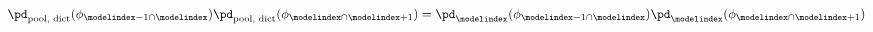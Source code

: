 \begin{equation}
  \pd_{\text{pool, dict}}(\phi_{\modelindex - 1 \cap \modelindex})
  \pd_{\text{pool, dict}}(\phi_{\modelindex \cap \modelindex + 1}) =
    \pd_{\modelindex}(\phi_{\modelindex - 1 \cap \modelindex})
    \pd_{\modelindex}(\phi_{\modelindex \cap \modelindex + 1})
  \label{eqn:dictatorial-def-three-part-two}
\end{equation}